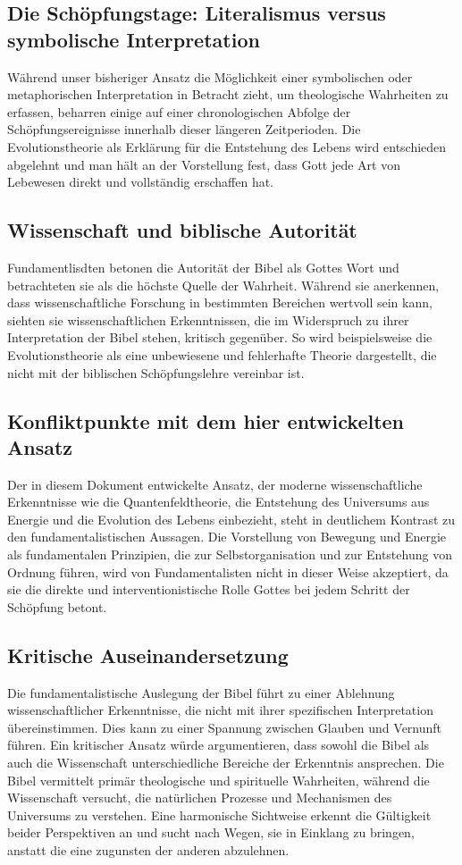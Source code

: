 \documentclass{article}
\begin{document}
\subsection*{Die Schöpfungstage: Literalismus versus symbolische Interpretation}

Während unser bisheriger Ansatz die Möglichkeit einer symbolischen oder metaphorischen Interpretation in Betracht zieht, um theologische Wahrheiten zu erfassen, beharren einige auf einer chronologischen Abfolge der Schöpfungsereignisse innerhalb dieser längeren Zeitperioden. Die Evolutionstheorie als Erklärung für die Entstehung des Lebens wird entschieden abgelehnt und man hält an der Vorstellung fest, dass Gott jede Art von Lebewesen direkt und vollständig erschaffen hat.

\subsection*{Wissenschaft und biblische Autorität}
 Fundamentlisdten betonen die Autorität der Bibel als Gottes Wort und betrachteten sie als die höchste Quelle der Wahrheit. Während sie anerkennen, dass wissenschaftliche Forschung in bestimmten Bereichen wertvoll sein kann, siehten sie wissenschaftlichen Erkenntnissen, die im Widerspruch zu ihrer Interpretation der Bibel stehen, kritisch gegenüber. So wird beispielsweise die Evolutionstheorie als eine unbewiesene und fehlerhafte Theorie dargestellt, die nicht mit der biblischen Schöpfungslehre vereinbar ist.

\subsection*{Konfliktpunkte mit dem hier entwickelten Ansatz}
Der in diesem Dokument entwickelte Ansatz, der moderne wissenschaftliche Erkenntnisse wie die Quantenfeldtheorie, die Entstehung des Universums aus Energie und die Evolution des Lebens einbezieht, steht in deutlichem Kontrast zu den fundamentalistischen Aussagen. Die Vorstellung von Bewegung und Energie als fundamentalen Prinzipien, die zur Selbstorganisation und zur Entstehung von Ordnung führen, wird von Fundamentalisten nicht in dieser Weise akzeptiert, da sie die direkte und interventionistische Rolle Gottes bei jedem Schritt der Schöpfung betont.

\subsection*{Kritische Auseinandersetzung}
Die fundamentalistische Auslegung der Bibel führt zu einer Ablehnung wissenschaftlicher Erkenntnisse, die nicht mit ihrer spezifischen Interpretation übereinstimmen. Dies kann zu einer Spannung zwischen Glauben und Vernunft führen. Ein kritischer Ansatz würde argumentieren, dass sowohl die Bibel als auch die Wissenschaft unterschiedliche Bereiche der Erkenntnis ansprechen. Die Bibel vermittelt primär theologische und spirituelle Wahrheiten, während die Wissenschaft versucht, die natürlichen Prozesse und Mechanismen des Universums zu verstehen. Eine harmonische Sichtweise erkennt die Gültigkeit beider Perspektiven an und sucht nach Wegen, sie in Einklang zu bringen, anstatt die eine zugunsten der anderen abzulehnen.
\end{document}
